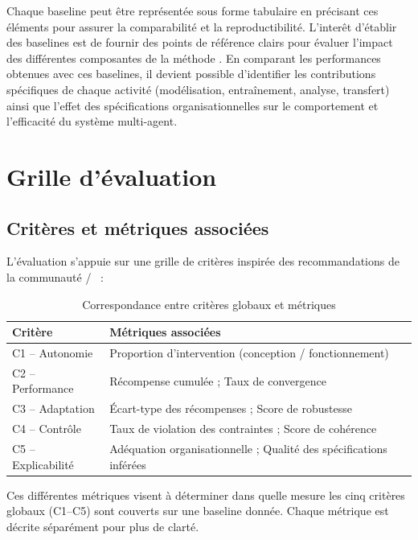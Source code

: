 Chaque baseline peut être représentée sous forme tabulaire en précisant ces éléments pour assurer la comparabilité et la reproductibilité. L'interêt d'établir des baselines est de fournir des points de référence clairs pour évaluer l'impact des différentes composantes de la méthode . En comparant les performances obtenues avec ces baselines, il devient possible d'identifier les contributions spécifiques de chaque activité (modélisation, entraînement, analyse, transfert) ainsi que l'effet des spécifications organisationnelles sur le comportement et l'efficacité du système multi-agent.

\section{Grille d’évaluation}

\subsection{Critères et métriques associées}
L’évaluation s’appuie sur une grille de critères inspirée des recommandations de la communauté /~\cite{papoudakis2021agent} :

\begin{table}[h!]
  \centering
  \caption{Correspondance entre critères globaux et métriques}
  \begin{tabular}{|l|l|}
    \hline
    \textbf{Critère}   & \textbf{Métriques associées}                                       \\
    \hline
    C1 – Autonomie     & Proportion d’intervention (conception / fonctionnement)            \\
    \hline
    C2 – Performance   & Récompense cumulée ; Taux de convergence                           \\
    \hline
    C3 – Adaptation    & Écart-type des récompenses ; Score de robustesse                   \\
    \hline
    C4 – Contrôle      & Taux de violation des contraintes ; Score de cohérence             \\
    \hline
    C5 – Explicabilité & Adéquation organisationnelle ; Qualité des spécifications inférées \\
    \hline
  \end{tabular}
  \label{tab:grille}
\end{table}

Ces différentes métriques visent à déterminer dans quelle mesure les cinq critères globaux (C1--C5) sont couverts sur une baseline donnée.
Chaque métrique est décrite séparément pour plus de clarté.

